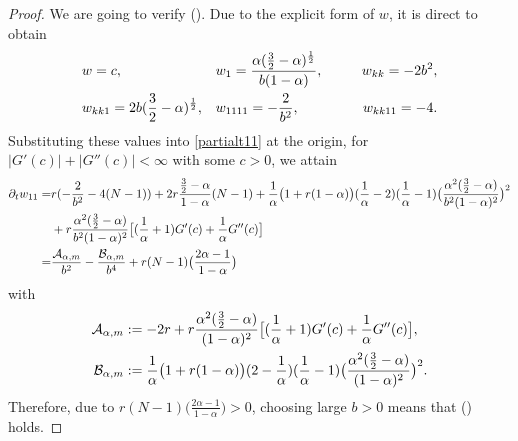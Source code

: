 \documentclass[10pt,a4paper]{amsart}
\begin{document}
\begin{proof}
We are going to verify (\expandafter{}).  Due to the explicit form of $w$,  it is direct to obtain  
\begin{align}
&w=c,         &&w_{1}=\frac{\alpha(\frac{3}{2}-\alpha)^{\frac{1}{2}}}{b(1-\alpha)},         &&&w_{kk}=-2b^2,\notag\\
&w_{kk1}=2b(\frac{3}{2}-\alpha)^{\frac{1}{2}},  &&w_{1111}=-\frac{2}{b^2},     &&&\ \ \ w_{kk11}=-4.\notag
\end{align}
Substituting these values into \eqref{partialt11} at the origin, for $|G'(c)|+|G''(c)|<\infty$ with some $c>0$, we attain
\begin{align}
\partial_t w_{11}=&r(-\frac{2}{b^2}-4(N-1))+2r\frac{\frac{3}{2}-\alpha}{1-\alpha}(N-1)\notag+\frac{1}{\alpha}\big(1+r(1-\alpha)\big)(\frac{1}{\alpha}-2)(\frac{1}{\alpha}-1)\big(\frac{\alpha^2(\frac{3}{2}-\alpha)}{b^2(1-\alpha)^2}\big)^{2}\notag\\
&+r\frac{\alpha^2(\frac{3}{2}-\alpha)}{b^2(1-\alpha)^2}\big[(\frac{1}{\alpha}+1)G'(c)+\frac{1}{\alpha}G''(c)\big]\notag\\
=&\frac{\mathcal{A}_{\alpha,m}}{b^2}-\frac{\mathcal{B}_{\alpha,m}}{b^4}+r(N-1)\big(\frac{2\alpha-1}{1-\alpha}\big)\notag
\end{align}
with \begin{align}\mathcal{A}_{\alpha,m}&:=-2r+r\frac{\alpha^2(\frac{3}{2}-\alpha)}{(1-\alpha)^2}\big[(\frac{1}{\alpha}+1)G'(c)+\frac{1}{\alpha}G''(c)\big],\notag\\
\mathcal{B}_{\alpha,m}&:=\frac{1}{\alpha}\big(1+r(1-\alpha)\big)(2-\frac{1}{\alpha})(\frac{1}{\alpha}-1)\big(\frac{\alpha^2(\frac{3}{2}-\alpha)}{(1-\alpha)^2}\big)^{2}.\notag\end{align}
Therefore, due to $r(N-1)\big(\frac{2\alpha-1}{1-\alpha})>0$, 
choosing large $b>0$ means that  (\expandafter{}) holds.
\end{proof}
\end{document}
